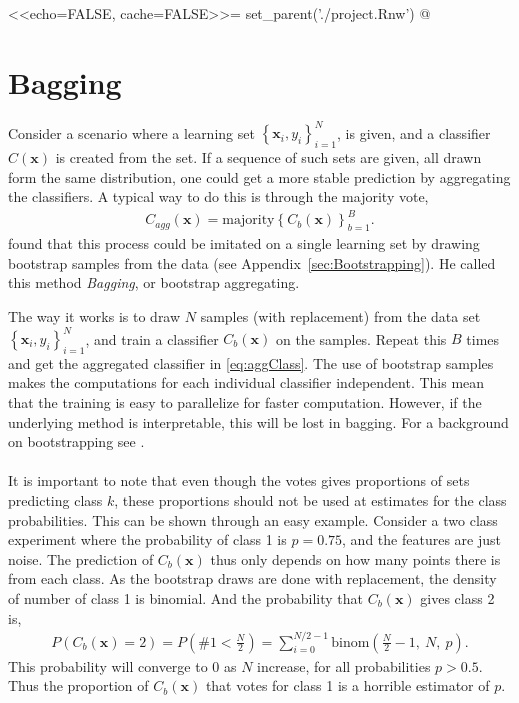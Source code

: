 <<echo=FALSE, cache=FALSE>>=
set_parent('./project.Rnw')
@
\section{Bagging}
\label{sec:Bagging}
Consider a scenario where a learning set $\left\{ \mathbf{x}_i, y_i \right\}_{i=1}^{N}$, is given, and a classifier $C(\mathbf{x})$ is created from the set. If a sequence of such sets are given, all drawn form the same distribution, one could get a more stable prediction by aggregating the classifiers. A typical way to do this is through the majority vote,
\begin{align}
  \label{eq:aggClass} 
  C_{agg}(\mathbf{x}) = \mathrm{majority} \left\{ C_b(\mathbf{x}) \right\}_{b=1}^{B}.
\end{align}
\cite{Breiman1996} found that this process could be imitated on a single learning set by drawing bootstrap samples from the data (see Appendix~\ref{sec:Bootstrapping}). He called this method \textit{Bagging}, or bootstrap aggregating. 

The way it works is to draw $N$ samples (with replacement) from the data set $\left\{ \mathbf{x}_i, y_i \right\}_{i=1}^{N}$, and train a classifier $C_b(\mathbf{x})$ on the samples. Repeat this $B$ times and get the aggregated classifier in  \eqref{eq:aggClass}. The use of bootstrap samples makes the computations for each individual classifier independent. This mean that the training is easy to parallelize for faster computation. However, if the underlying method is interpretable, this will be lost in bagging.
For a background on bootstrapping see \cite{efron1994bootstrap}.
\\
\\
It is important to note that even though the votes gives proportions of sets predicting class $k$, these proportions should not be used at estimates for the class probabilities. This can be shown through an easy example. Consider a two class experiment where the probability of class 1 is $p = 0.75$, and the features are just noise. The prediction of $C_b(\mathbf{x})$ thus only depends on how many points there is from each class. As the bootstrap draws are done with replacement, the density of number of class 1 is binomial. And the probability that $C_b(\mathbf{x})$ gives class 2 is,
\begin{align}
  P(C_b(\mathbf{x})=2) = P\left(\#1 <  \frac{N}{2} \right) = \sum_{i = 0}^{N/2 - 1} \mathrm{binom}\left(\frac{N}{2}-1,\: N,\: p  \right).
\end{align}
This probability will converge to 0 as $N$ increase, for all probabilities $p > 0.5$. Thus the proportion of $C_b(\mathbf{x})$ that votes for class 1 is a horrible estimator of $p$.


